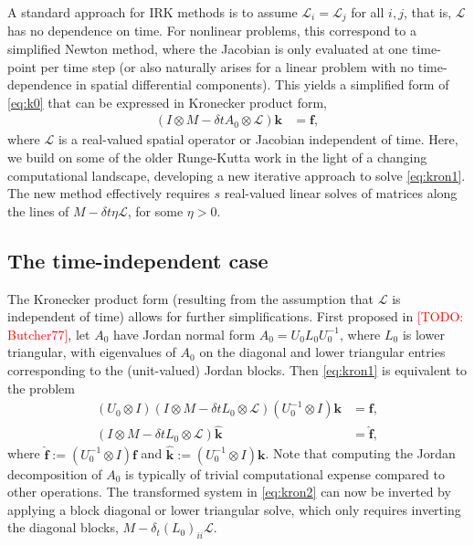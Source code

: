\documentclass[a4paper,10pt]{article}
\makeatletter
\newcommand{\todo}[1]{\textcolor{red}{[TODO\@: #1]}}
\makeatother
\begin{document}
A standard approach for IRK methods is to assume $\mathcal{L}_i = \mathcal{L}_j$ for all $i,j$,
that is, $\mathcal{L}$ has no dependence on time. For nonlinear problems, this correspond to
a simplified Newton method, where the Jacobian is only evaluated at one time-point per time
step (or also naturally arises for a linear problem with no time-dependence in spatial
differential components). This yields a simplified form of \eqref{eq:k0} that can be
expressed in Kronecker product form,
%
\begin{align}\label{eq:kron1}
(I\otimes M - \delta t A_0\otimes \mathcal{L})\mathbf{k} & = \mathbf{f},
\end{align}
%
where $\mathcal{L}$ is a real-valued spatial operator or Jacobian independent of time.
Here, we build on some of the older Runge-Kutta work in the light of a changing
computational landscape, developing a new iterative approach to solve \eqref{eq:kron1}.
The new method effectively requires $s$ real-valued linear solves of matrices along the
lines of $M - \delta t\eta\mathcal{L}$, for some $\eta > 0$. 



\subsection{The time-independent case}

The Kronecker product form (resulting from the assumption that $\mathcal{L}$ is independent of
time) allows for further simplifications. First proposed in \todo{Butcher77}, let $A_0$ have
Jordan normal form $A_0 = U_0L_0U_0^{-1}$, where $L_0$ is lower triangular, with eigenvalues
of $A_0$ on the diagonal and lower triangular entries corresponding to the (unit-valued)
Jordan blocks. Then \eqref{eq:kron1} is equivalent to the problem
%
\begin{align}\label{eq:kron2}
(U_0\otimes I)(I\otimes M - \delta t L_0\otimes \mathcal{L})(U_0^{-1}\otimes I)\mathbf{k} & = \mathbf{f},\\
(I\otimes M - \delta t L_0\otimes \mathcal{L})\hat{\mathbf{k}} & = \hat{\mathbf{f}},
\end{align}
%
where $\hat{\mathbf{f}} := (U_0^{-1}\otimes I)\mathbf{f}$ and
$\hat{\mathbf{k}} := (U_0^{-1}\otimes I)\mathbf{k}$. Note that computing the Jordan
decomposition of $A_0$ is typically of trivial computational expense compared to other
operations. The transformed system in \eqref{eq:kron2} can now be inverted by applying
a block diagonal or lower triangular solve, which only requires inverting the diagonal
blocks, $M - \delta_t(L_0)_{ii}\mathcal{L}$.
\end{document}
